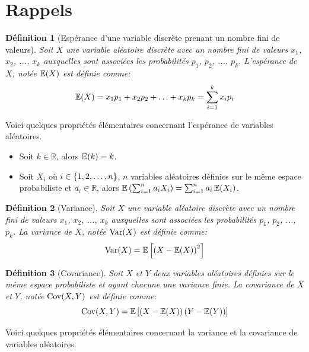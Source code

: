 \documentclass[10pt]{article}
\newtheorem{definition}{Définition}
\begin{document}
\appendix

\hypertarget{rappels}{%
\section{\texorpdfstring{Rappels
\label{rappel_esperance}}{Rappels }}\label{rappels}}

\begin{definition}[Espérance d'une variable discrète prenant un nombre fini de valeurs]
Soit $X$ une variable aléatoire discrète avec un nombre fini de valeurs $x_1$, $x_2$, ..., $x_k$ auxquelles sont associées les probabilités $p_1$, $p_2$, ..., $p_k$. L'espérance de $X$, notée $\operatorname{\mathbb{E}} (X)$ est définie comme:
$$ \operatorname{\mathbb{E}} (X) = x_1p_1+x_2p_2+\ldots +x_kp_k = \sum_{i=1}^k x_i p_i $$
\end{definition}

Voici quelques propriétés élémentaires concernant l'espérance de
variables aléatoires.

\begin{itemize}
\item
  Soit \(k\in\mathbb{R}\), alors \(\operatorname{\mathbb{E}}(k)=k\).
\item
  Soit \(X_i\) où \(i\in\left\{1,2,\ldots,n\right\}\), \(n\) variables aléatoires
  définies sur le même espace probabiliste et \(a_i\in\mathbb{R}\),
  alors \(\operatorname{\mathbb{E}}\left(\sum_{i=1}^na_iX_i\right)=\sum_{i=1}^n a_i\operatorname{\mathbb{E}}(X_i)\).
\end{itemize}

\begin{definition}[Variance]
Soit $X$ une variable aléatoire discrète avec un nombre fini de valeurs $x_1$, $x_2$, ..., $x_k$ auxquelles sont associées les probabilités $p_1$, $p_2$, ..., $p_k$. La variance de $X$, notée $\operatorname{Var} (X)$ est définie comme:
$$ \operatorname{Var} (X) = \operatorname{\mathbb{E}}\left[\left(X-\operatorname{\mathbb{E}}(X)\right)^2\right] $$
\end{definition}

\begin{definition}[Covariance]
Soit $X$ et $Y$ deux variables aléatoires définies sur le même espace probabiliste et ayant chacune une variance finie. La covariance de $X$ et $Y$, notée $\operatorname{Cov}(X,Y)$ est définie comme:
$$ \operatorname{Cov}(X,Y)=\operatorname{\mathbb{E}}\left[\left(X-\operatorname{\mathbb{E}}(X)\right)\left(Y-\operatorname{\mathbb{E}}(Y)\right)\right] $$
\end{definition}

Voici quelques propriétés élémentaires concernant la variance et la
covariance de variables aléatoires.
\end{document}
